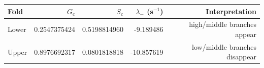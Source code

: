\begin{tabular}{@{}lrrrr@{}}
\toprule
Fold & $G_c$ & $S_c$ & $\lambda_-$ (s$^{-1}$) & Interpretation \\
\midrule
Lower & 0.2547375424 & 0.5198814960 & -9.189486 & high/middle branches appear \\
Upper & 0.8976692317 & 0.0801818818 & -10.857619 & low/middle branches disappear \\
\bottomrule
\end{tabular}
